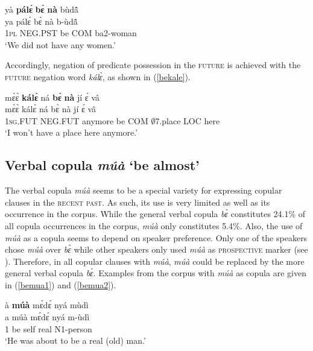 \begin{exe} 
\ex\label{bepale}
  \glll  yà {\bfseries pálɛ́} {\bfseries bɛ̀} {\bfseries nà} bùdã̂ \\
      ya pálɛ́ bɛ̀ nà b-ùdã̂ \\
        1\textsc{pl} NEG.PST be COM ba2-woman  \\
    \trans `We did not have any women.'
\end{exe}

\noindent Accordingly, negation of predicate possession in the \textsc{future} is achieved with the \textsc{future} negation word {\itshape kálɛ̀}, as shown in (\ref{bekale}).


\begin{exe} 
\ex\label{bekale}
  \glll  mɛ̀ɛ̀ {\bfseries kálɛ̀} ná {\bfseries bɛ̀} {\bfseries nà} jí ɛ́ vâ \\
        mɛ̀ɛ̀ kálɛ̀ ná bɛ̀ nà jí ɛ́ vâ \\
           1\textsc{sg}.FUT NEG.FUT anymore be COM $\emptyset$7.place LOC here  \\
    \trans `I won't have a place here anymore.'
\end{exe}









\subsection{Verbal copula {\itshape múà} `be almost'}
\label{sec:COPmua}

The verbal copula {\itshape múà} seems to be a special variety for expressing copular clauses in the \textsc{recent past}. As such, its use is very limited as well as its occurrence in the corpus. While the general verbal copula {\itshape bɛ̀} constitutes 24.1\% of all copula occurrences in the corpus, {\itshape múà} only constitutes 5.4\%.  Also, the use of {\itshape múà} as a copula seems to depend on speaker preference. Only one of the speakers chose {\itshape múà} over {\itshape bɛ̀} while other speakers only used {\itshape múà} as \textsc{prospective} marker (see ). Therefore, in all copular clauses with {\itshape múà}, {\itshape múà} could be replaced by the more general verbal copula {\itshape bɛ̀}. Examples from the corpus with {\itshape múà} as copula are given in (\ref{bemua1}) and (\ref{bemua2}).


\begin{exe} 
\ex\label{bemua1}
  \glll  à {\bfseries múà} mɛ́dɛ́ nyá mùdì \\
          a múà mɛ́dɛ́ nyá m-ùdì   \\
         1 be self real N1-person    \\
    \trans `He was about to be a real (old) man.'
\end{exe}


